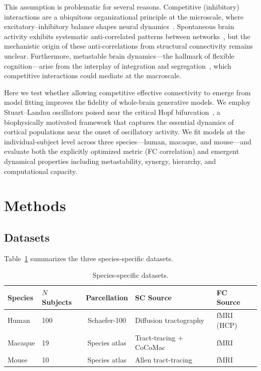 \documentclass[11pt]{article}
\begin{document}
This assumption is problematic for several reasons.  Competitive (inhibitory) interactions are a ubiquitous organizational principle at the microscale, where excitatory--inhibitory balance shapes neural dynamics~\citep{wilson1972excitatory}.  Spontaneous brain activity exhibits systematic anti-correlated patterns between networks~\citep{fox2005human}, but the mechanistic origin of these anti-correlations from structural connectivity remains unclear.  Furthermore, metastable brain dynamics---the hallmark of flexible cognition---arise from the interplay of integration and segregation~\citep{deco2015rethinking,shanahan2010metastable}, which competitive interactions could mediate at the macroscale.

Here we test whether allowing competitive effective connectivity to emerge from model fitting improves the fidelity of whole-brain generative models.  We employ Stuart--Landau oscillators poised near the critical Hopf bifurcation~\citep{hopf1942abzweigung,deco2017dynamics}, a biophysically motivated framework that captures the essential dynamics of cortical populations near the onset of oscillatory activity.  We fit models at the individual-subject level across three species---human, macaque, and mouse---and evaluate both the explicitly optimized metric (FC correlation) and emergent dynamical properties including metastability, synergy, hierarchy, and computational capacity.

\section{Methods}

\subsection{Datasets}

Table~\ref{tab:datasets} summarizes the three species-specific datasets.

\begin{table}[ht]
\centering
\caption{Species-specific datasets.}
\label{tab:datasets}
\begin{tabular}{@{}llcll@{}}
\toprule
Species & $N$ Subjects & Parcellation & SC Source & FC Source \\
\midrule
Human & 100 & Schaefer-100 & Diffusion tractography & fMRI (HCP) \\
Macaque & 19 & Species atlas & Tract-tracing + CoCoMac & fMRI \\
Mouse & 10 & Species atlas & Allen tract-tracing & fMRI \\
\bottomrule
\end{tabular}
\end{table}
\end{document}

